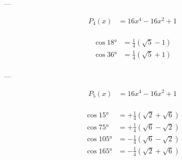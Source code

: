 ---

$$
\begin{aligned}
    P_{4}(x) &= 16 x^4-16 x^2+1\\
\end{aligned}
$$

$$
\begin{aligned}
    \cos 18° &= \frac{1}{4} \left(\sqrt{5}-1\right)\\
    \cos 36° &= \frac{1}{4} \left(\sqrt{5}+1\right)\\
\end{aligned}
$$

---

$$
\begin{aligned}
    P_{5}(x) &= 16 x^4-16 x^2+1\\
\end{aligned}
$$

$$
\begin{aligned}
    \cos 15°  &= +\frac{1}{4} \left(\sqrt{2}+\sqrt{6}\right)\\
    \cos 75°  &= +\frac{1}{4} \left(\sqrt{6}-\sqrt{2}\right)\\
    \cos 105° &= -\frac{1}{4} \left(\sqrt{6}-\sqrt{2}\right)\\
    \cos 165° &= -\frac{1}{4} \left(\sqrt{2}+\sqrt{6}\right)\\
\end{aligned}
$$